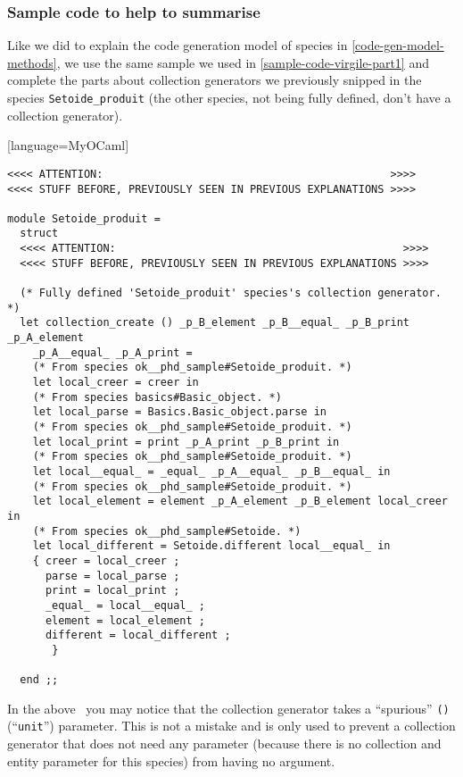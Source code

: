 \subsubsection{Sample code to help to summarise}
Like we did to explain the code generation model of species in
\ref{code-gen-model-methods}, we use the same sample we used in
\ref{sample-code-virgile-part1} and complete the parts about
collection generators we previously snipped in the species
{\tt Setoide\_produit} (the other species, not being fully defined,
don't have a collection generator).
{\footnotesize[language=MyOCaml]
\begin{lstlisting}
<<<< ATTENTION:                                             >>>>
<<<< STUFF BEFORE, PREVIOUSLY SEEN IN PREVIOUS EXPLANATIONS >>>>

module Setoide_produit =
  struct
  <<<< ATTENTION:                                             >>>>
  <<<< STUFF BEFORE, PREVIOUSLY SEEN IN PREVIOUS EXPLANATIONS >>>>

  (* Fully defined 'Setoide_produit' species's collection generator. *)
  let collection_create () _p_B_element _p_B__equal_ _p_B_print _p_A_element
    _p_A__equal_ _p_A_print =
    (* From species ok__phd_sample#Setoide_produit. *)
    let local_creer = creer in
    (* From species basics#Basic_object. *)
    let local_parse = Basics.Basic_object.parse in
    (* From species ok__phd_sample#Setoide_produit. *)
    let local_print = print _p_A_print _p_B_print in
    (* From species ok__phd_sample#Setoide_produit. *)
    let local__equal_ = _equal_ _p_A__equal_ _p_B__equal_ in
    (* From species ok__phd_sample#Setoide_produit. *)
    let local_element = element _p_A_element _p_B_element local_creer in
    (* From species ok__phd_sample#Setoide. *)
    let local_different = Setoide.different local__equal_ in
    { creer = local_creer ;
      parse = local_parse ;
      print = local_print ;
      _equal_ = local__equal_ ;
      element = local_element ;
      different = local_different ;
       }
    
  end ;;
\end{lstlisting}
}

\label{point-the-extra-unit-parameter-need}
In the above \ocaml\ you may notice that the collection generator
takes a ``spurious'' {\tt ()} (``{\tt unit}'') parameter. This is not
a mistake and is only used to prevent a collection generator that does
not need any parameter (because there is no collection and entity
parameter for this species) from having no argument.

